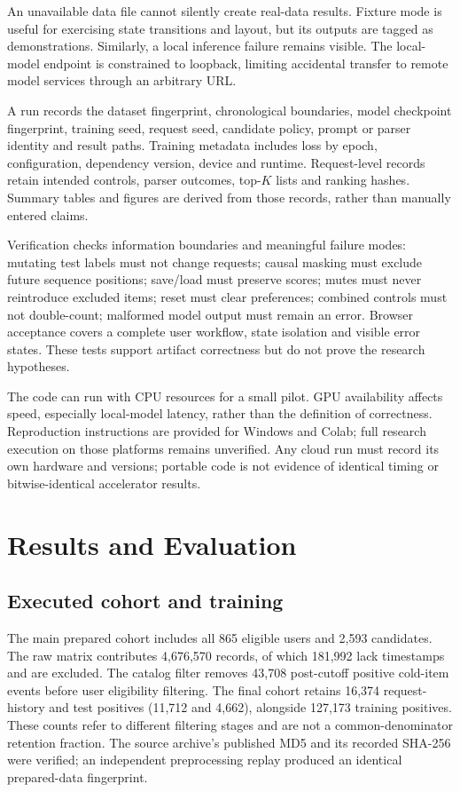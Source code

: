 \documentclass[conference]{IEEEtran}
\begin{document}
An unavailable data file cannot silently create real-data results. Fixture mode is useful for exercising state transitions and layout, but its outputs are tagged as demonstrations. Similarly, a local inference failure remains visible. The local-model endpoint is constrained to loopback, limiting accidental transfer to remote model services through an arbitrary URL.

A run records the dataset fingerprint, chronological boundaries, model checkpoint fingerprint, training seed, request seed, candidate policy, prompt or parser identity and result paths. Training metadata includes loss by epoch, configuration, dependency version, device and runtime. Request-level records retain intended controls, parser outcomes, top-$K$ lists and ranking hashes. Summary tables and figures are derived from those records, rather than manually entered claims.

Verification checks information boundaries and meaningful failure modes: mutating test labels must not change requests; causal masking must exclude future sequence positions; save/load must preserve scores; mutes must never reintroduce excluded items; reset must clear preferences; combined controls must not double-count; malformed model output must remain an error. Browser acceptance covers a complete user workflow, state isolation and visible error states. These tests support artifact correctness but do not prove the research hypotheses.

The code can run with CPU resources for a small pilot. GPU availability affects speed, especially local-model latency, rather than the definition of correctness. Reproduction instructions are provided for Windows and Colab; full research execution on those platforms remains unverified. Any cloud run must record its own hardware and versions; portable code is not evidence of identical timing or bitwise-identical accelerator results.

\section{Results and Evaluation}
\label{sec:results}
\subsection{Executed cohort and training}
The main prepared cohort includes all 865 eligible users and 2,593 candidates. The raw matrix contributes 4,676,570 records, of which 181,992 lack timestamps and are excluded. The catalog filter removes 43,708 post-cutoff positive cold-item events before user eligibility filtering. The final cohort retains 16,374 request-history and test positives (11,712 and 4,662), alongside 127,173 training positives. These counts refer to different filtering stages and are not a common-denominator retention fraction. The source archive's published MD5 and its recorded SHA-256 were verified; an independent preprocessing replay produced an identical prepared-data fingerprint.
\end{document}

